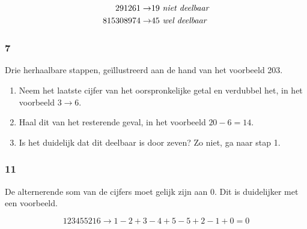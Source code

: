 \documentclass[10pt]{article}
\begin{document}
\begin{align*}
	291261 \to & 19 \text{ \emph{niet deelbaar}} \\
	815308974 \to & 45 \text{ \emph{wel deelbaar}}
\end{align*}

\subsubsection{7}

Drie herhaalbare stappen, ge\"illustreerd aan de hand van het voorbeeld 203.

\begin{enumerate}
	\item Neem het laatste cijfer van het oorspronkelijke getal en verdubbel het, in het voorbeeld $3 \to 6$.
	\item Haal dit van het resterende geval, in het voorbeeld $20 - 6 = 14$.
	\item Is het duidelijk dat dit deelbaar is door zeven? Zo niet, ga naar stap 1.
\end{enumerate}

\subsubsection{11}

De alternerende som van de cijfers moet gelijk zijn aan 0. Dit is duidelijker met een voorbeeld.

\[123455216 \to 1 - 2 + 3 - 4 + 5 - 5 + 2 - 1 + 0 = 0\]
\end{document}
